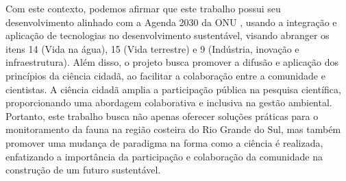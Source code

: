 Com este contexto, podemos afirmar que este trabalho possui seu desenvolvimento alinhado com a Agenda 2030 da ONU \cite{onu2015agenda2030}, usando a integração e aplicação de tecnologias no desenvolvimento sustentável, visando abranger os itens 14 (Vida na água), 15 (Vida terrestre) e 9 (Indústria, inovação e infraestrutura). Além disso, o projeto busca promover a difusão e aplicação dos princípios da ciência cidadã, ao facilitar a colaboração entre a comunidade e cientistas. A ciência cidadã amplia a participação pública na pesquisa científica, proporcionando uma abordagem colaborativa e inclusiva na gestão ambiental. Portanto, este trabalho busca não apenas oferecer soluções práticas para o monitoramento da fauna na região costeira do Rio Grande do Sul, mas também promover uma mudança de paradigma na forma como a ciência é realizada, enfatizando a importância da participação e colaboração da comunidade na construção de um futuro sustentável. 
